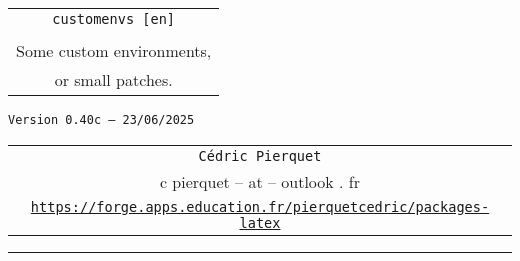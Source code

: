 \documentclass[english,11pt,a4paper]{article}
\def\TPversion{0.40c}
\def\TPdate{23/06/2025}
\begin{document}
\pagestyle{fancy}

\thispagestyle{empty}

\begin{center}
	\begin{minipage}{0.75\linewidth}
	\begin{tcolorbox}[colframe=yellow,colback=yellow!15]
		\begin{center}
			\renewcommand\arraystretch{1.25}
			\begin{tabular}{c}
				{\Huge \texttt{customenvs [en]}}\\
				\\
				{\Large Some custom environments,} \\
				{\Large or small patches.} \\
			\end{tabular}
			\renewcommand\arraystretch{1}
			
			\medskip
			
			{\small \texttt{Version \TPversion{} -- \TPdate}}
		\end{center}
	\end{tcolorbox}
\end{minipage}
\end{center}

\vspace*{1mm}

\begin{center}
	\begin{tabular}{c}
	\texttt{Cédric Pierquet}\\
	{\ttfamily c pierquet -- at -- outlook . fr}\\
	\texttt{\url{https://forge.apps.education.fr/pierquetcedric/packages-latex}}
\end{tabular}
\end{center}

\vspace*{5mm}

%
%
%
%
%

\hrule


\hypertarget{matoc}{}

\tableofcontents

\vspace*{5mm}
\end{document}
